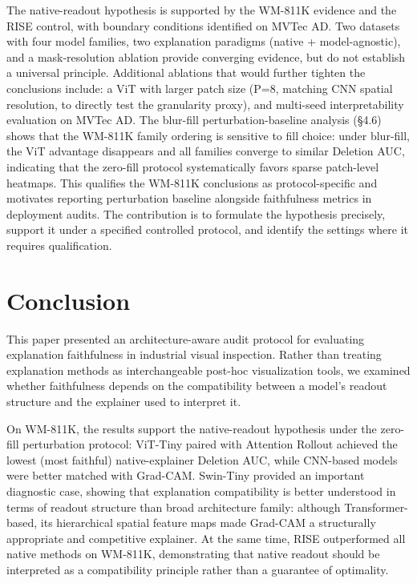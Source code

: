 \documentclass[11pt,a4paper]{article}
\begin{document}
The native-readout hypothesis is supported by the WM-811K evidence and the RISE control, with boundary conditions identified on MVTec AD. Two datasets with four model families, two explanation paradigms (native + model-agnostic), and a mask-resolution ablation provide converging evidence, but do not establish a universal principle. Additional ablations that would further tighten the conclusions include: a ViT with larger patch size (P=8, matching CNN spatial resolution, to directly test the granularity proxy), and multi-seed interpretability evaluation on MVTec AD. The blur-fill perturbation-baseline analysis (\S{}4.6) shows that the WM-811K family ordering is sensitive to fill choice: under blur-fill, the ViT advantage disappears and all families converge to similar Deletion AUC, indicating that the zero-fill protocol systematically favors sparse patch-level heatmaps. This qualifies the
WM-811K conclusions as protocol-specific and motivates reporting perturbation baseline alongside faithfulness metrics in deployment audits. The contribution is to formulate the hypothesis precisely, support it under a specified controlled protocol, and identify the settings where it requires qualification.

\section{Conclusion}

This paper presented an architecture-aware audit protocol for evaluating explanation faithfulness in industrial visual inspection. Rather than treating explanation methods as interchangeable post-hoc visualization tools, we examined whether faithfulness depends on the compatibility between a model's readout structure and the explainer used to interpret it.

On WM-811K, the results support the native-readout hypothesis under the zero-fill perturbation protocol: ViT-Tiny paired with Attention Rollout achieved the lowest (most faithful) native-explainer Deletion AUC, while CNN-based models were better matched with Grad-CAM. Swin-Tiny provided an important diagnostic case, showing that explanation compatibility is better understood in terms of readout structure than broad architecture family: although Transformer-based, its hierarchical spatial feature maps made Grad-CAM a structurally appropriate and competitive explainer. At the same time, RISE outperformed all native methods on WM-811K, demonstrating that native readout should be interpreted as a compatibility principle rather than a guarantee of optimality.
\end{document}
